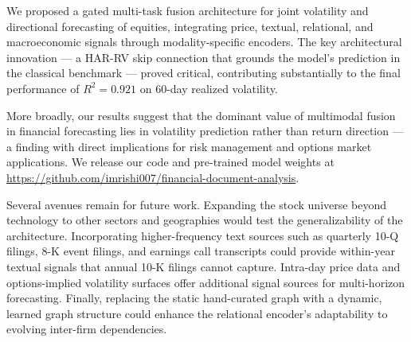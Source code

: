 \documentclass[12pt, a4paper]{article}
\begin{document}
We proposed a gated multi-task fusion architecture for joint volatility and directional forecasting of equities, integrating price, textual, relational, and macroeconomic signals through modality-specific encoders. The key architectural innovation --- a HAR-RV skip connection that grounds the model's prediction in the classical benchmark --- proved critical, contributing substantially to the final performance of $R^2 = 0.921$ on 60-day realized volatility.

More broadly, our results suggest that the dominant value of multimodal fusion in financial forecasting lies in volatility prediction rather than return direction --- a finding with direct implications for risk management and options market applications. We release our code and pre-trained model weights at \url{https://github.com/imrishi007/financial-document-analysis}.

Several avenues remain for future work. Expanding the stock universe beyond technology to other sectors and geographies would test the generalizability of the architecture. Incorporating higher-frequency text sources such as quarterly 10-Q filings, 8-K event filings, and earnings call transcripts could provide within-year textual signals that annual 10-K filings cannot capture. Intra-day price data and options-implied volatility surfaces offer additional signal sources for multi-horizon forecasting. Finally, replacing the static hand-curated graph with a dynamic, learned graph structure could enhance the relational encoder's adaptability to evolving inter-firm dependencies.


\newpage

\end{document}
